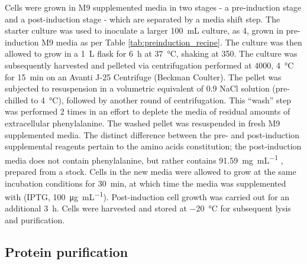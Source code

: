 \begin{refsection}
Cells were grown in M9 supplemented media in two stages - a pre-induction stage
and a post-induction stage - which are separated by a media shift step.  The
starter culture was used to inoculate a larger \SI{100}{\mL} culture, as
\SI{4}{\volper}, grown in pre-induction M9 media as per Table
\ref{tab:preinduction_recipe}.  The culture was then allowed to grow in a
\SI{1}{\L} flask for \SI{6}{\hour} at \SI{37}{\celsius}, shaking at
\SI{350}{\rpm}. The culture was subsequently harvested and pelleted via
centrifugation performed at \SI{4000}{\gforce}, \SI{4}{\celsius} for
\SI{15}{\minute} on an Avanti J-25 Centrifuge (Beckman Coulter). The pellet was
subjected to resuspension in a volumetric equivalent of \SI{0.9}{\wtper} NaCl
solution (pre-chilled to \SI{4}{\celsius}), followed by another round of
centrifugation.  This ``wash'' step was performed 2 times in an effort to
deplete the media of residual amounts of extracellular phenylalanine. The washed
pellet was resuspended in fresh M9 supplemented media.  The distinct difference
between the pre- and post-induction supplemental reagents pertain to the amino
acids constitution; the post-induction media does not contain phenylalanine, but
rather contains \SI{91.59}{\mg\per\mL} ,
prepared from a stock.  Cells in the new media were allowed to grow at the same
incubation conditions for \SI{30}{\minute}, at which time the media was
supplemented with  (IPTG,
\SI{100}{\ug\per\mL}). Post-induction cell growth was carried out for an
additional \SI{3}{\hour}. Cells were harvested and stored at \SI{-20}{\celsius}
for subsequent lysis and purification.

\subsection{Protein purification}


\end{refsection}
